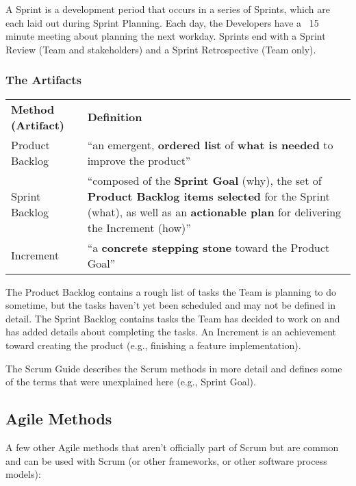 \spacer
A Sprint is a development period that occurs in a series of Sprints, which are each laid out during Sprint Planning. Each day, the Developers have a ~15 minute meeting about planning the next workday. Sprints end with a Sprint Review (Team and stakeholders) and a Sprint Retrospective (Team only). 

\subsubsection{The Artifacts}

\noindent\begin{tabular}{p{1.5in}|p{5in}}
\rowcolor{gray!35}
\textbf{Method (Artifact)} & \textbf{Definition}\\
Product Backlog\index{product backlog} & ``an emergent, \textbf{ordered list} of \textbf{what is needed} to improve the product'' \\
Sprint Backlog\index{sprint backlog} & ``composed of the \textbf{Sprint Goal}\index{sprint goal} (why), the set of \textbf{Product Backlog items selected} for the Sprint (what), as well as an \textbf{actionable plan} for delivering the Increment (how)'' \\
Increment\index{scrum increment} & ``a \textbf{concrete stepping stone} toward the Product Goal\index{product goal}''
\end{tabular}
\spacer

The Product Backlog contains a rough list of tasks the Team is planning to do sometime, but the tasks haven't yet been scheduled and may not be defined in detail. The Sprint Backlog contains tasks the Team has decided to work on and has added details about completing the tasks. An Increment is an achievement toward creating the product (e.g., finishing a feature implementation).

The Scrum Guide \parencite{schwaber2020scrum} describes the Scrum methods in more detail and defines some of the terms that were unexplained here (e.g., Sprint Goal).

\subsection{Agile Methods}

A few other Agile methods that aren't officially part of Scrum but are common and can be used with Scrum (or other frameworks, or other software process models):

